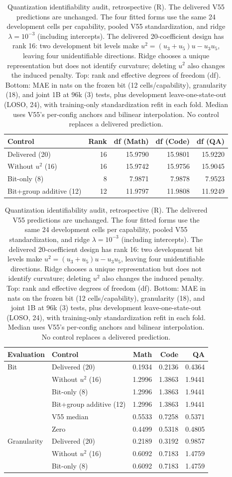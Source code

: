 \begin{table}[H]
\centering\small
\caption{Quantization identifiability audit, retrospective (R). The delivered V55 predictions are unchanged. The four fitted forms use the same 24 development cells per capability, pooled V55 standardization, and ridge $\lambda=10^{-3}$ (including intercepts). The delivered 20-coefficient design has rank 16: two development bit levels make $u^2=(u_3+u_5)u-u_3u_5$, leaving four unidentifiable directions. Ridge chooses a unique representation but does not identify curvature; deleting $u^2$ also changes the induced penalty. Top: rank and effective degrees of freedom (df). Bottom: MAE in nats on the frozen bit (12 cells/capability), granularity (18), and joint 1B at 96k (3) tests, plus development leave-one-state-out (LOSO, 24), with training-only standardization refit in each fold. Median uses V55's per-config anchors and bilinear interpolation. No control replaces a delivered prediction.}
\label{tab:quant_ident}
\begin{tabular}{@{}lrrrr@{}}
\toprule
Control & Rank & df (Math) & df (Code) & df (QA) \\
\midrule
Delivered (20) & 16 & 15.9790 & 15.9801 & 15.9220 \\
Without $u^2$ (16) & 16 & 15.9742 & 15.9756 & 15.9045 \\
Bit-only (8) & 8 & 7.9871 & 7.9878 & 7.9523 \\
Bit+group additive (12) & 12 & 11.9797 & 11.9808 & 11.9249 \\
\bottomrule
\end{tabular}
\par\medskip
\begin{tabular}{@{}llrrr@{}}
\toprule
Evaluation & Control & Math & Code & QA \\
\midrule
Bit & Delivered (20) & 0.1934 & 0.2136 & 0.4364 \\
 & Without $u^2$ (16) & 1.2996 & 1.3863 & 1.9441 \\
 & Bit-only (8) & 1.2996 & 1.3863 & 1.9441 \\
 & Bit+group additive (12) & 1.2996 & 1.3863 & 1.9441 \\
 & V55 median & 0.5533 & 0.7258 & 0.5371 \\
 & Zero & 0.4499 & 0.5318 & 0.4805 \\
\addlinespace
Granularity & Delivered (20) & 0.2189 & 0.3192 & 0.9857 \\
 & Without $u^2$ (16) & 0.6092 & 0.7183 & 1.4759 \\
 & Bit-only (8) & 0.6092 & 0.7183 & 1.4759 \\

\end{tabular}
\end{table}
